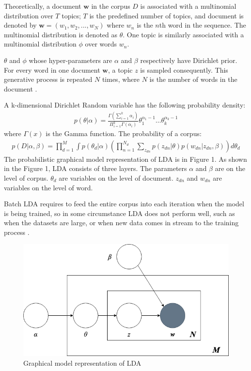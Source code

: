 \documentclass{article} %
\begin{document}
Theoretically, a document $\bm{w}$ in the corpus $D$ is associated with a multinomial distribution over $T$ topics; $T$ is the predefined number of topics, and document is denoted by $\bm{w} = (w_1, w_2, ..., w_N)$ where $w_n$ is the $n$th word in the sequence. The multinomial distribution is denoted as $\theta$. One topic is similarly associated with a multinomial distribution $\phi$ over words $w_n$.

$\theta$ and $\phi$ whose hyper-parameters are $\alpha$ and $\beta$ respectively have Dirichlet prior. For every word in one document $\bm{w}$, a topic $z$ is sampled consequently. This generative process is repeated $N$ times, where $N$ is the number of words in the document \cite{hong_empirical_2010}.

A k-dimensional Dirichlet Random variable has the following probability density:
\begin{align}
      p(\theta|\alpha) = \frac{\Gamma(\sum_{i=1}^{k} \alpha_i)}{\Pi_{i=1}^{k}\Gamma(\alpha_i)}\theta_{1}^{\alpha_{1}-1}\dots\theta_{k}^{\alpha_{k}-1}
\end{align}
where $\Gamma(x)$ is the Gamma function.
The probability of a corpus:
\begin{align}
      p(D|\alpha, \beta) = \displaystyle \prod_{d=1}^{M}\int p(\theta_{d}|\alpha) \left( \displaystyle  \prod_{n=1}^{N_d}\sum_{z_{dn}}p(z_{dn}|\theta)p(w_{dn}|z_{dn}, \beta) \right)d\theta_d
\end{align}
The probabilistic graphical model representation of LDA is in Figure 1. As shown in the Figure 1, LDA consists of three layers. The parameters $\alpha$ and $\beta$ are on the level of corpus. $\theta_{d}$ are variables on the level of document. $z_{dn}$ and $w_{dn}$ are variables on the level of word.

Batch LDA requires to feed the entire corpus into each iteration when the model is being trained, so in some circumstance LDA does not perform well, such as when the datasets are large, or when new data comes in stream to the training process \cite{hoffman_online_2010}. 
\begin{figure}[H]
      \graphicspath{ {images/} }
      \begin{center}
            \includegraphics[scale=0.4]{LDA.png}
      \end{center}
      \caption{Graphical model representation of LDA}
\end{figure}
\end{document}
